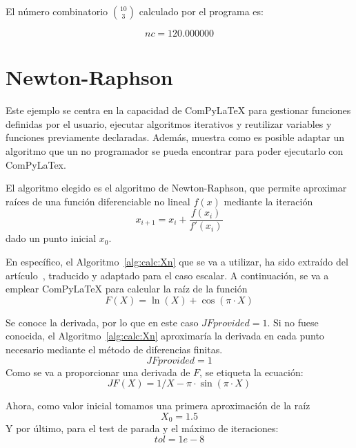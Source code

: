 \documentclass{book}
\begin{document}
El número combinatorio $\binom{10}{3}$ calculado por el programa es:

\begin{equation}
    nc =
    120.000000
    \label{eq:res:nc}
\end{equation}

\section{Newton-Raphson} \label{sec:n-r}
Este ejemplo se centra en la capacidad de ComPyLaTeX para gestionar funciones definidas por el usuario, ejecutar algoritmos iterativos y reutilizar variables y funciones previamente declaradas. Además, muestra como es posible adaptar un algoritmo que un no programador se pueda encontrar para poder ejecutarlo con ComPyLaTex.

El algoritmo elegido es el algoritmo de Newton-Raphson, que permite aproximar raíces de una función diferenciable no lineal $f(x)$ mediante la iteración $$x_{i+1}=x_i+\frac{f(x_i)}{f'(x_i)}$$ dado un punto inicial $x_0$. 

En específico, el Algoritmo~\ref{alg:calc:Xn} que se va a utilizar, ha sido extraído del artículo~\cite{freire_newtons_2024}, traducido y adaptado para el caso escalar. A continuación, se va a emplear ComPyLaTeX para calcular la raíz de la función 
\begin{equation}
    F(X) = \ln(X) + \cos(\pi \cdot X)
    \label{eq:calc:F}
\end{equation}

Se conoce la derivada, por lo que en este caso $JFprovided = 1$. Si no fuese conocida, el Algoritmo~\ref{alg:calc:Xn} aproximaría la derivada en cada punto necesario mediante el método de diferencias finitas.
\begin{equation}
    JFprovided = 1
    \label{eq:calc:JFprovided}
\end{equation}
Como se va a proporcionar una derivada de $F$, se etiqueta la ecuación:
\begin{equation}
    JF(X) = 1/X - \pi \cdot \sin(\pi \cdot X)
    \label{eq:calc:JF}
\end{equation}

Ahora, como valor inicial tomamos una primera aproximación de la raíz
\begin{equation}
    X_0 = 1.5
    \label{eq:calc:X0}
\end{equation}
Y por último, para el test de parada y el máximo de iteraciones: 
\begin{equation}
    tol = 1e-8
    \label{eq:calc:tol}
\end{equation}
\end{document}
